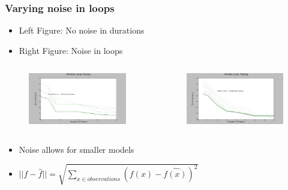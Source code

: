 \documentclass{beamer}
\begin{document}


\begin{frame}
\frametitle{Varying noise in loops}

\begin{itemize}
\item Left Figure: No noise in durations
\item Right Figure: Noise in loops

\end{itemize}

\begin{columns}[c]

\begin{figure}

\includegraphics[width=1.0\linewidth]{lucasplots/monImages/DoubleLoopTiming0.png}
\end{figure}

\begin{figure}
\includegraphics[width=1.0\linewidth]{lucasplots/monImages/DoubleLoopTiming0_1.png}
\end{figure}

\end{columns}

\begin{itemize}
\item Noise allows for smaller models

\item $||f - \hat{f}|| = \sqrt{\sum\nolimits_{x \in observations}(f(x) - \hat{f(x)})^2}$ 
\end{itemize}

\end{frame}
\end{document}

